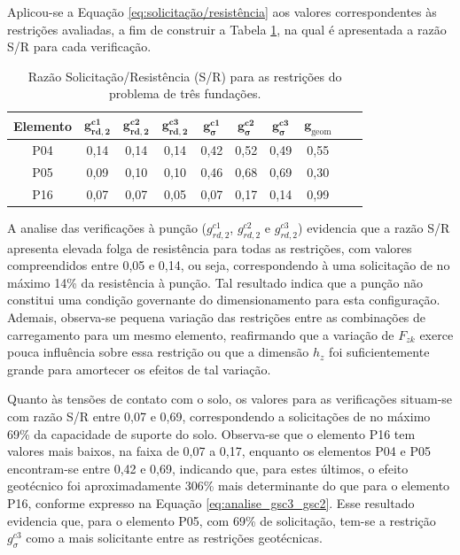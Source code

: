 Aplicou-se a Equação \eqref{eq:solicitação/resistência} aos valores correspondentes às restrições avaliadas, a fim de construir a Tabela \ref{tab:S/R_tres_fundação}, na qual é apresentada a razão S/R para cada verificação.

\begin{table}[htpb!]
\centering
\caption{Razão Solicitação/Resistência (S/R) para as restrições do problema de três fundações.}
\label{tab:S/R_tres_fundação}
\begin{tabular}{cccccccccc}
\toprule
\textbf{Elemento} &
$\mathbf{g_{rd,2}^{c1}}$ &
$\mathbf{g_{rd,2}^{c2}}$ &
$\mathbf{g_{rd,2}^{c3}}$ &
$\mathbf{g_{\sigma}^{c1}}$ &
$\mathbf{g_{\sigma}^{c2}}$ &
$\mathbf{g_{\sigma}^{c3}}$ &
$\mathbf{g_{\mathrm{geom}}}$ \\
\midrule
P04 & 0,14 & 0,14 & 0,14 & 0,42 & 0,52 & 0,49 & 0,55 \\
P05 & 0,09 & 0,10 & 0,10 & 0,46 & 0,68 & 0,69 & 0,30 \\
P16 & 0,07 & 0,07 & 0,05 & 0,07 & 0,17 & 0,14 & 0,99 \\
\bottomrule
\end{tabular}
\end{table}

A analise das verificações à punção ($g_{rd,2}^{c1}$, $g_{rd,2}^{c2}$ e $g_{rd,2}^{c3}$) evidencia que a razão S/R apresenta elevada folga de resistência para todas as restrições, com valores compreendidos entre 0,05 e 0,14, ou seja, correspondendo à uma solicitação de no máximo 14\% da resistência à punção. Tal resultado indica que a punção não constitui uma condição governante do dimensionamento para esta configuração. Ademais, observa-se pequena variação das restrições entre as combinações de carregamento para um mesmo elemento, reafirmando que a variação de $F_{zk}$ exerce pouca influência sobre essa restrição ou que a dimensão $h_z$ foi suficientemente grande para amortecer os efeitos de tal variação. 

Quanto às tensões de contato com o solo, os valores para as verificações situam-se com razão S/R entre 0,07 e 0,69, correspondendo a solicitações de no máximo 69\% da capacidade de suporte do solo. Observa-se que o elemento P16 tem valores mais baixos, na faixa de 0,07 a 0,17, enquanto os elementos P04 e P05 encontram-se entre 0,42 e 0,69, indicando que, para estes últimos, o efeito geotécnico foi aproximadamente 306\% mais determinante do que para o elemento P16, conforme expresso na Equação \eqref{eq:analise_gsc3_gsc2}. Esse resultado evidencia que, para o elemento P05, com 69\% de solicitação, tem-se a restrição $g_{\sigma}^{c3}$ como a mais solicitante entre as restrições geotécnicas.

